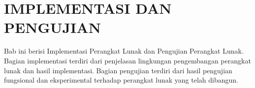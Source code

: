 \chapter{IMPLEMENTASI DAN PENGUJIAN}
\label{chap:implementasiPengujian}

Bab ini berisi Implementasi Perangkat Lunak dan Pengujian Perangkat Lunak. Bagian implementasi
terdiri dari penjelasan lingkungan pengembangan perangkat lunak dan hasil implementasi. Bagian
pengujian terdiri dari hasil pengujian fungsional dan eksperimental terhadap perangkat lunak yang
telah dibangun.
